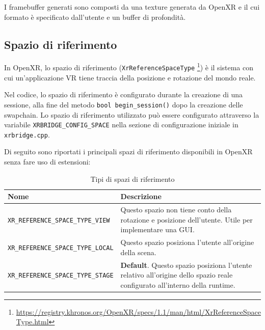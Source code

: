 \documentclass[twoside]{supsistudent}
\begin{document}
I framebuffer generati sono composti da una texture generata da OpenXR e il cui formato è specificato dall'utente e un buffer di profondità.

\subsection{Spazio di riferimento}

In OpenXR, lo spazio di riferimento (\texttt{XrReferenceSpaceType} \footnote{\url{https://registry.khronos.org/OpenXR/specs/1.1/man/html/XrReferenceSpaceType.html}}) è il sistema con cui un'applicazione VR tiene traccia della posizione e rotazione del mondo reale.

Nel codice, lo spazio di riferimento è configurato durante la creazione di una sessione, alla fine del metodo \texttt{bool begin\_session()} dopo la creazione delle swapchain. Lo spazio di riferimento utilizzato può essere configurato attraverso la variabile \texttt{XRBRIDGE\_CONFIG\_SPACE} nella sezione di configurazione iniziale in \texttt{xrbridge.cpp}.

Di seguito sono riportati i principali spazi di riferimento disponibili in OpenXR senza fare uso di estensioni:

\begin{table}[H]
  \caption{Tipi di spazi di riferimento}
  \begin{center}
    \begin{tabular}{ m{7cm} m{6cm} }
      Nome                                             & Descrizione \\
      \hline
      \texttt{XR\_REFERENCE\_SPACE\_TYPE\_VIEW}        & Questo spazio non tiene conto della rotazione e posizione dell'utente. Utile per implementare una GUI. \\
      \texttt{XR\_REFERENCE\_SPACE\_TYPE\_LOCAL}       & Questo spazio posiziona l'utente all'origine della scena. \\
      \texttt{XR\_REFERENCE\_SPACE\_TYPE\_STAGE}       & \textbf{Default}. Questo spazio posiziona l'utente relativo all'origine dello spazio reale configurato all'interno della runtime. \\
    \end{tabular}
  \end{center}
\end{table}
\end{document}
